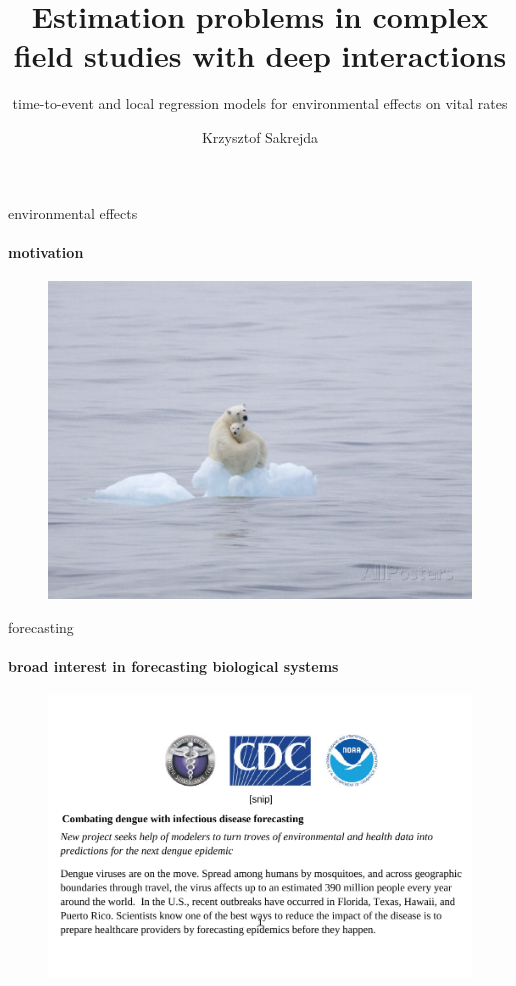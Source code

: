 \documentclass[show notes]{beamer}
\title{Estimation problems in complex field studies with deep interactions}
\subtitle{time-to-event and local regression models for environmental effects on vital rates}
\author{Krzysztof Sakrejda}
\institute{Organismic and Evolutionary Biology \\ University of Massachusetts, Amherst}
\begin{document}
\maketitle


\begin{frame}{environmental effects}
  \framesubtitle{motivation}

	\begin{figure}
	\includegraphics[width=.8\textwidth]{bears-on-ice.jpg}
  	\end{figure}
  
\end{frame}

\begin{frame}{forecasting}
  \framesubtitle{broad interest in forecasting biological systems}

	\begin{figure}
	\includegraphics[width=\textwidth]{dengue-forecast-challenge.pdf}
  	\end{figure}
  
\end{frame}
\end{document}
